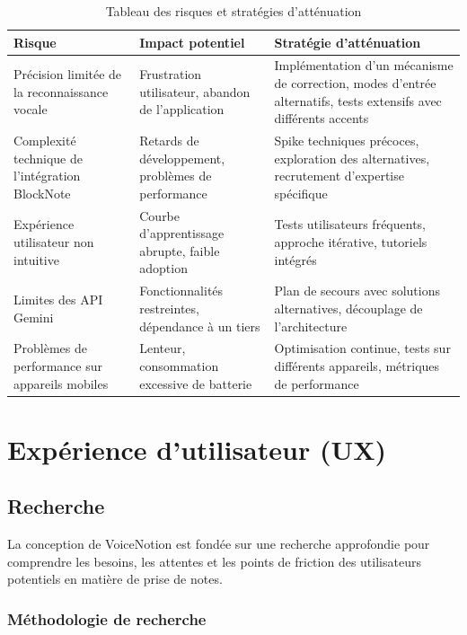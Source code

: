 \begin{table}[H]
\centering
\begin{tabular}{|p{3cm}|p{5cm}|p{5cm}|}
\hline
\textbf{Risque} & \textbf{Impact potentiel} & \textbf{Stratégie d'atténuation} \\
\hline
Précision limitée de la reconnaissance vocale & Frustration utilisateur, abandon de l'application & Implémentation d'un mécanisme de correction, modes d'entrée alternatifs, tests extensifs avec différents accents \\
\hline
Complexité technique de l'intégration BlockNote & Retards de développement, problèmes de performance & Spike techniques précoces, exploration des alternatives, recrutement d'expertise spécifique \\
\hline
Expérience utilisateur non intuitive & Courbe d'apprentissage abrupte, faible adoption & Tests utilisateurs fréquents, approche itérative, tutoriels intégrés \\
\hline
Limites des API Gemini & Fonctionnalités restreintes, dépendance à un tiers & Plan de secours avec solutions alternatives, découplage de l'architecture \\
\hline
Problèmes de performance sur appareils mobiles & Lenteur, consommation excessive de batterie & Optimisation continue, tests sur différents appareils, métriques de performance \\
\hline
\end{tabular}
\caption{Tableau des risques et stratégies d'atténuation}
\label{tab:risk_management}
\end{table}

\section{Expérience d'utilisateur (UX)}

\subsection{Recherche}

La conception de VoiceNotion est fondée sur une recherche approfondie pour comprendre les besoins, les attentes et les points de friction des utilisateurs potentiels en matière de prise de notes.

\subsubsection{Méthodologie de recherche}

